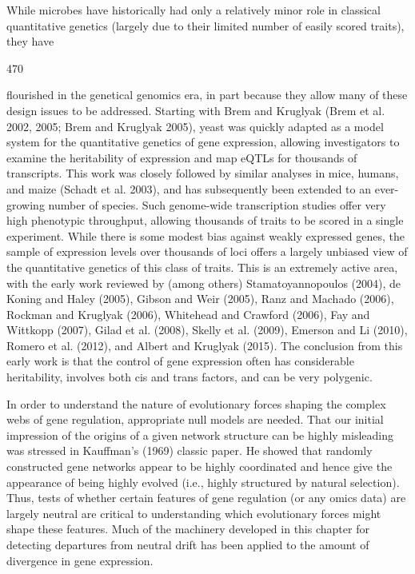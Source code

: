 \documentclass{article}
\begin{document}
While microbes have historically had only a relatively minor role in classical quantitative genetics (largely due to their limited number of easily scored traits), they have

470

flourished in the genetical genomics era, in part because they allow many of these design issues to be addressed. Starting with Brem and Kruglyak (Brem et al. 2002, 2005; Brem and Kruglyak 2005), yeast was quickly adapted as a model system for the quantitative genetics of gene expression, allowing investigators to examine the heritability of expression and map eQTLs for thousands of transcripts. This work was closely followed by similar analyses in mice, humans, and maize (Schadt et al. 2003), and has subsequently been extended to an ever-growing number of species. Such genome-wide transcription studies offer very high phenotypic throughput, allowing thousands of traits to be scored in a single experiment. While there is some modest bias against weakly expressed genes, the sample of expression levels over thousands of loci offers a largely unbiased view of the quantitative genetics of this class of traits. This is an extremely active area, with the early work reviewed by (among others) Stamatoyannopoulos (2004), de Koning and Haley (2005), Gibson and Weir (2005), Ranz and Machado (2006), Rockman and Kruglyak (2006), Whitehead and Crawford (2006), Fay and Wittkopp (2007), Gilad et al. (2008), Skelly et al. (2009), Emerson and Li (2010), Romero et al. (2012), and Albert and Kruglyak (2015). The conclusion from this early work is that the control of gene expression often has considerable heritability, involves both cis and trans factors, and can be very polygenic.

In order to understand the nature of evolutionary forces shaping the complex webs of gene regulation, appropriate null models are needed. That our initial impression of the origins of a given network structure can be highly misleading was stressed in Kauffman's (1969) classic paper. He showed that randomly constructed gene networks appear to be highly coordinated and hence give the appearance of being highly evolved (i.e., highly structured by natural selection). Thus, tests of whether certain features of gene regulation (or any omics data) are largely neutral are critical to understanding which evolutionary forces might shape these features. Much of the machinery developed in this chapter for detecting departures from neutral drift has been applied to the amount of divergence in gene expression.
\end{document}
